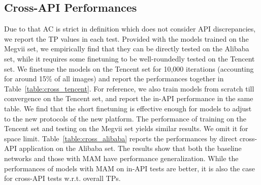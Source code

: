 \documentclass[sigconf]{acmart}
\begin{document}
\subsection{Cross-API Performances}
Due to that AC is strict in definition which does not consider API discrepancies, we report the TP values in each test.
Provided with the models trained on the Megvii set, we empirically find that they can be directly tested on the Alibaba set, while it requires some finetuning to be well-roundedly tested on the Tencent set.
We finetune the models on the Tencent set for 10,000 iterations (accounting for around 15\% of all images) and report the performances together in Table~\ref{table:cross_tencent}. 
For reference, we also train models from scratch till convergence on the Tencent set, and report the in-API performance in the same table.
We find that the short finetuning is effective enough for models to adjust to the new protocols of the new platform.
The performance of training on the Tencent set and testing on the Megvii set yields similar results.
We omit it for space limit.
Table~\ref{table:cross_alibaba} reports the performances by direct cross-API application on the Alibaba set.
The results show that both the baseline networks and those with MAM have performance generalization. 
While the performances of models with MAM on in-API tests are better, it is also the case for cross-API tests w.r.t. overall TPs.
\end{document}
